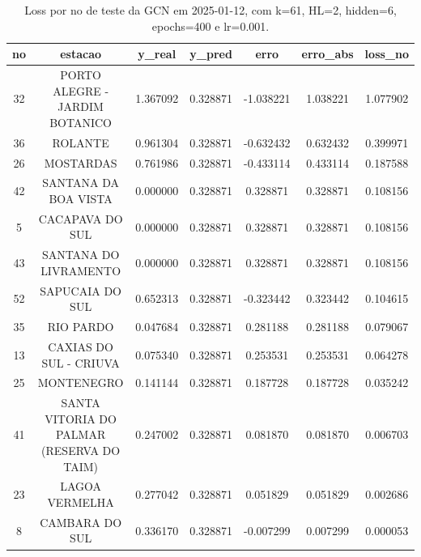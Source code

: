 \begin{table}[h]
\centering
\caption{Loss por no de teste da GCN em 2025-01-12, com k=61, HL=2, hidden=6, epochs=400 e lr=0.001.}
\label{tab:gcn_loss_k61_hl2_h6_e400_d20250112}
\begin{tabular}{ccccccc}
\toprule
no & estacao & y\_real & y\_pred & erro & erro\_abs & loss\_no \\
\midrule
32 & PORTO ALEGRE - JARDIM BOTANICO & 1.367092 & 0.328871 & -1.038221 & 1.038221 & 1.077902 \\
36 & ROLANTE & 0.961304 & 0.328871 & -0.632432 & 0.632432 & 0.399971 \\
26 & MOSTARDAS & 0.761986 & 0.328871 & -0.433114 & 0.433114 & 0.187588 \\
42 & SANTANA DA BOA VISTA & 0.000000 & 0.328871 & 0.328871 & 0.328871 & 0.108156 \\
5 & CACAPAVA DO SUL & 0.000000 & 0.328871 & 0.328871 & 0.328871 & 0.108156 \\
43 & SANTANA DO LIVRAMENTO & 0.000000 & 0.328871 & 0.328871 & 0.328871 & 0.108156 \\
52 & SAPUCAIA DO SUL & 0.652313 & 0.328871 & -0.323442 & 0.323442 & 0.104615 \\
35 & RIO PARDO & 0.047684 & 0.328871 & 0.281188 & 0.281188 & 0.079067 \\
13 & CAXIAS DO SUL - CRIUVA & 0.075340 & 0.328871 & 0.253531 & 0.253531 & 0.064278 \\
25 & MONTENEGRO & 0.141144 & 0.328871 & 0.187728 & 0.187728 & 0.035242 \\
41 & SANTA VITORIA DO PALMAR (RESERVA DO TAIM) & 0.247002 & 0.328871 & 0.081870 & 0.081870 & 0.006703 \\
23 & LAGOA VERMELHA & 0.277042 & 0.328871 & 0.051829 & 0.051829 & 0.002686 \\
8 & CAMBARA DO SUL & 0.336170 & 0.328871 & -0.007299 & 0.007299 & 0.000053 \\
\bottomrule
\end{tabular}
\end{table}
